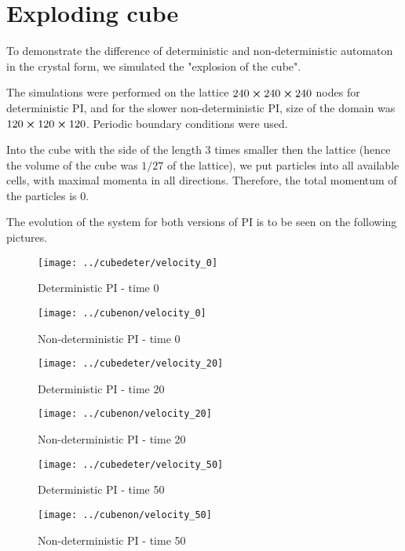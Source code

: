 \section{Exploding cube}
To demonstrate the difference of deterministic and non-deterministic automaton in the crystal form, we simulated the "explosion of the cube". 

The simulations were performed on the lattice $240 \cross 240 \cross 240$ nodes for deterministic PI, and for the slower non-deterministic PI, size of the domain was $120 \cross 120 \cross 120$. Periodic boundary conditions were used.

Into the cube with the side of the length 3 times smaller then the lattice (hence the volume of the cube was $1/27$ of the lattice), we put particles into all available cells, with maximal momenta in all directions. Therefore, the total momentum of the particles is 0.

The evolution of the system for both versions of PI is to be seen on the following pictures.
\newpage
\begin{figure}[H]
 \centering 
 \texttt{[image: ../cubedeter/velocity\_0]}
 \caption{Deterministic PI - time 0}
\end{figure}

\begin{figure}[H]
 \centering 
 \texttt{[image: ../cubenon/velocity\_0]}
 \caption{Non-deterministic PI - time 0}
\end{figure}

\begin{figure}[H]
 \centering 
 \texttt{[image: ../cubedeter/velocity\_20]}
 \caption{Deterministic PI - time 20}
\end{figure}

\begin{figure}[H]
 \centering 
 \texttt{[image: ../cubenon/velocity\_20]}
 \caption{Non-deterministic PI - time 20}
\end{figure}

\begin{figure}[H]
 \centering 
 \texttt{[image: ../cubedeter/velocity\_50]}
 \caption{Deterministic PI - time 50}
\end{figure}

\begin{figure}[H]
 \centering 
 \texttt{[image: ../cubenon/velocity\_50]}
 \caption{Non-deterministic PI - time 50}
\end{figure}

